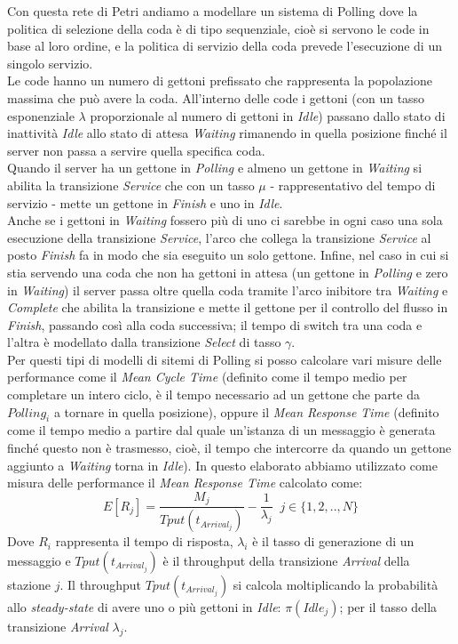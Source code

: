 \documentclass[12pt,a4paper,italian]{article}
\begin{document}
Con questa rete di Petri andiamo a modellare un sistema di Polling dove la politica di selezione della coda è di tipo sequenziale, cioè si servono le code in base al loro ordine, e la politica di servizio della coda prevede l'esecuzione di un singolo servizio. \\
Le code hanno un numero di gettoni prefissato che rappresenta la popolazione massima che può avere la coda. All'interno delle code i gettoni  (con un tasso esponenziale $\lambda$ proporzionale al numero di gettoni in \emph{Idle})  passano dallo stato di inattività \emph{Idle} allo stato di attesa \emph{Waiting} rimanendo in quella posizione finché il server non passa a servire quella specifica coda.\\ Quando il server ha un gettone in \emph{Polling} e almeno un gettone in \emph{Waiting} si abilita la transizione \emph{Service} che con un tasso $\mu$ - rappresentativo del tempo di servizio - mette un gettone in \emph{Finish} e uno in \emph{Idle}.\\ Anche se i gettoni in \emph{Waiting} fossero più di uno ci sarebbe in ogni caso una sola esecuzione della transizione \emph{Service}, l'arco che collega la transizione \emph{Service} al posto \emph{Finish} fa in modo che sia eseguito un solo gettone. Infine, nel caso in cui si stia servendo una coda che non ha gettoni in attesa (un gettone in \emph{Polling} e zero in \emph{Waiting}) il server passa oltre quella coda tramite l'arco inibitore tra \emph{Waiting} e \emph{Complete} che abilita la transizione e mette il gettone per il controllo del flusso in \emph{Finish}, passando così alla coda successiva; il tempo di switch tra una coda e l'altra è modellato dalla transizione \emph{Select} di tasso $\gamma$.\\
Per questi tipi di modelli di sitemi di Polling si posso calcolare vari misure delle performance come il \emph{Mean Cycle Time} (definito come il tempo medio per completare un intero ciclo, è il tempo necessario ad un gettone che parte da $Polling_i$ a tornare in quella posizione), oppure il \emph{Mean Response Time} (definito come il tempo medio  a partire dal quale un'istanza di un messaggio è generata finché questo non è trasmesso, cioè, il tempo che intercorre da quando un gettone aggiunto a \emph{Waiting} torna in \emph{Idle}). In questo elaborato abbiamo utilizzato come misura delle performance il \emph{Mean Response Time} calcolato come:
\begin{equation}
E[R_j] = \frac{M_j}{Tput(t_{Arrival_j})} - \frac{1}{\lambda_j}\;\; j \in\{1,2,..,N\} 
\label{er1}
\end{equation} 
Dove $R_i$ rappresenta il tempo di risposta, $\lambda_i$ è il tasso di generazione di un messaggio e $Tput(t_{Arrival_j})$ è il throughput della transizione \emph{Arrival} della stazione $j$. Il throughput $Tput(t_{Arrival_j})$ si calcola moltiplicando la probabilità allo \emph{steady-state} di avere uno o più gettoni in \emph{Idle}: $\pi(Idle_j)$; per il tasso della transizione \emph{Arrival} $\lambda_j$.  
\end{document}
